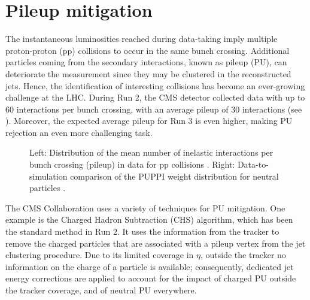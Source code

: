 \documentclass[a4paper,11pt]{article}
\begin{document}
\section{Pileup mitigation}
The instantaneous luminosities reached during data-taking imply multiple proton-proton (pp) collisions to occur in the same bunch crossing. Additional particles coming from the secondary interactions, known as pileup (PU), can deteriorate the measurement since they may be clustered in the reconstructed jets. Hence, the identification of interesting collisions has become an ever-growing challenge at the LHC. During Run 2, the CMS detector collected data with up to 60 interactions per bunch crossing, with an average pileup of 30 interactions (see ). Moreover, the expected average pileup for Run 3 is even higher, making PU rejection an even more challenging task.


\begin{figure}[htb]
\centering
{}
\caption{
Left: Distribution of the mean number of inelastic interactions per bunch crossing (pileup) in data for pp collisions \citep{Puppi}. 
Right: Data-to-simulation comparison of the PUPPI weight distribution for neutral particles \citep{Puppi}. 
}
\label{fig:LumiPileUpPuppiWeight}
\end{figure}

The CMS Collaboration uses a variety of techniques for PU mitigation. One example is the Charged Hadron Subtraction (CHS) algorithm, which has been the standard method in Run 2.
It uses the information from the tracker to remove the charged particles that are associated with a pileup vertex from the jet clustering procedure.
Due to its limited coverage in $\eta$, outside the tracker no information on the charge of a particle is available; consequently, dedicated jet energy corrections are applied to account for the impact of charged PU outside the tracker coverage, and of neutral PU everywhere.
\end{document}
